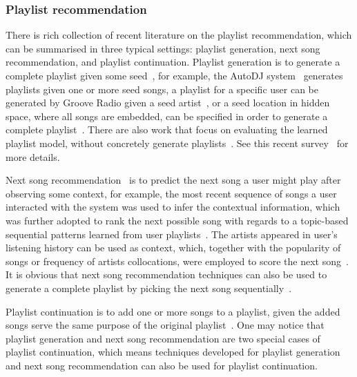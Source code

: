 \subsubsection{Playlist recommendation}
There is rich collection of recent literature on the playlist 
recommendation,
which can be summarised in three typical settings: 
playlist generation, next song recommendation, and playlist continuation.
Playlist generation is to generate a complete playlist given some 
seed~\cite{platt2002learning,mcfee2011natural,mcfee2012hypergraph,chen2012playlist,ben2017groove},
for example, the AutoDJ system~\cite{platt2002learning} generates playlists given one or more seed songs,
a playlist for a specific user can be generated by Groove Radio given a seed artist~\cite{ben2017groove},
or a seed location in hidden space, where all songs are embedded,
can be specified in order to generate a complete playlist~\cite{chen2012playlist}.
There are also work that focus on evaluating the learned playlist model,
without concretely generate playlists~\cite{mcfee2011natural,mcfee2012hypergraph}.
See this recent survey~\cite{bonnin2015automated} for more details.

Next song recommendation~\cite{hariri2012context,bonnin2013evaluating,jannach2015beyond}
is to predict the next song a user might play after observing some context,
for example, the most recent sequence of songs a user interacted with the system was used to
infer the contextual information, which was further adopted to rank the next possible song
with regards to a topic-based sequential patterns learned from user playlists~\cite{hariri2012context}.
The artists appeared in user's listening history can be used as context,
which, together with the popularity of songs or frequency of artists collocations,
were employed to score the next song~\cite{mcfee2012million,bonnin2013evaluating}.
It is obvious that next song recommendation techniques can also be used to generate a
complete playlist by picking the next song sequentially~\cite{bonnin2013evaluating,ben2017groove}.

Playlist continuation is to add one or more songs to a playlist,
given the added songs serve the same purpose of the original playlist~\cite{schedl2017,recsysch2018}.
One may notice that playlist generation and next song recommendation are two special cases
of playlist continuation, which means techniques developed for playlist generation and
next song recommendation can also be used for playlist continuation.


